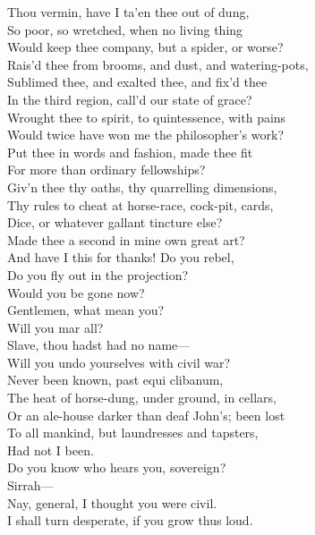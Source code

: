 \documentclass[a4paper,oneside]{memoir}
\begin{document}
\begin{drama*}
Thou vermin, have I ta'en thee out of dung,\\
So poor, so wretched, when no living thing\\
Would keep thee company, but a spider, or worse?\\
Rais'd thee from brooms, and dust, and watering-pots,\\
Sublimed thee, and exalted thee, and fix'd thee\\
In the third region, call'd our state of grace?\\
Wrought thee to spirit, to quintessence, with pains\\
Would twice have won me the philosopher's work?\\
Put thee in words and fashion, made thee fit\\
For more than ordinary fellowships?\\
Giv'n thee thy oaths, thy quarrelling dimensions,\\
Thy rules to cheat at horse-race, cock-pit, cards,\\
Dice, or whatever gallant tincture else?\\
Made thee a second in mine own great art?\\
And have I this for thanks! Do you rebel,\\
Do you fly out in the projection?\\
Would you be gone now?\\
\dolspeaks {} Gentlemen, what mean you?\\
Will you mar all?\\
\subtlespeaks {} Slave, thou hadst had no name---\\
\dolspeaks Will you undo yourselves with civil war?\\
\subtlespeaks Never been known, past equi clibanum,\\
The heat of horse-dung, under ground, in cellars,\\
Or an ale-house darker than deaf John's; been lost\\
To all mankind, but laundresses and tapsters,\\
Had not I been.\\
\dolspeaks {} Do you know who hears you, sovereign?\\
\facespeaks Sirrah---\\
\dolspeaks {} Nay, general, I thought you were civil.\\
\facespeaks I shall turn desperate, if you grow thus loud.\\

\end{drama*}
\end{document}
